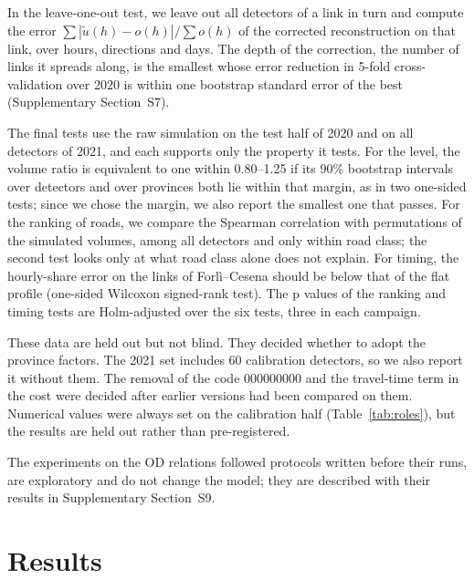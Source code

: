 \documentclass[preprint,11pt,a4paper]{elsarticle}
\begin{document}
In the leave-one-out test, we leave out all detectors of a link in turn and compute the error $\sum|\widetilde u(h)-o(h)|/\sum o(h)$ of the corrected reconstruction on that link, over hours, directions and days. The depth of the correction, the number of links it spreads along, is the smallest whose error reduction in 5-fold cross-validation over 2020 is within one bootstrap standard error of the best (Supplementary Section~S7).

The final tests use the raw simulation on the test half of 2020 and on all detectors of 2021, and each supports only the property it tests. For the level, the volume ratio is equivalent to one within 0.80--1.25 if its 90\% bootstrap intervals over detectors and over provinces both lie within that margin, as in two one-sided tests; since we chose the margin, we also report the smallest one that passes. For the ranking of roads, we compare the Spearman correlation with permutations of the simulated volumes, among all detectors and only within road class; the second test looks only at what road class alone does not explain. For timing, the hourly-share error on the links of Forl\`i--Cesena should be below that of the flat profile (one-sided Wilcoxon signed-rank test). The p values of the ranking and timing tests are Holm-adjusted over the six tests, three in each campaign.

These data are held out but not blind. They decided whether to adopt the province factors. The 2021 set includes 60 calibration detectors, so we also report it without them. The removal of the code 000000000 and the travel-time term in the cost were decided after earlier versions had been compared on them. Numerical values were always set on the calibration half (Table~\ref{tab:roles}), but the results are held out rather than pre-registered.

The experiments on the OD relations followed protocols written before their runs, are exploratory and do not change the model; they are described with their results in Supplementary Section~S9.

\section{Results}
\label{sec:results}
\end{document}
